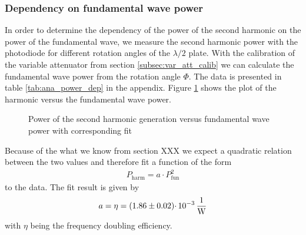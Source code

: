 \documentclass{protokoll_en}
\begin{document}
\subsubsection{Dependency on fundamental wave power}\label{subsubsec:ana_power_dep}
In order to determine the dependency of the power of the second harmonic on the power of the fundamental wave, we measure the second harmonic power with the photodiode for different rotation angles of the $\lambda / 2$ plate. With the calibration of the variable attenuator from section \ref{subsec:var_att_calib} we can calculate the fundamental wave power from the rotation angle $\Phi$. The data is presented in table \ref{tab:ana_power_dep} in the appendix. Figure \ref{fig:ana_power_dep} shows the plot of the harmonic versus the fundamental wave power.
\begin{figure}[H]
  \resizebox{0.8\textwidth}{!}{
     
}
  \caption{Power of the second harmonic generation versus fundamental wave power with corresponding fit}
  \label{fig:ana_power_dep}
\end{figure}
Because of the what we know from section XXX we expect a quadratic relation between the two values and therefore fit a function of the form
\begin{align}
P_\textrm{harm} = a\cdotp P^2_\textrm{fun}
\end{align}
to the data. The fit result is given by
\begin{align}
a = \eta = \unit[(1.86 \pm 0.02)\cdotp 10^{-3}]{\frac{1}{W}}
\end{align}
with $\eta$ being the frequency doubling efficiency.
\end{document}
